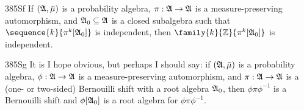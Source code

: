 \spheader 385Sf  If $(\frak A,\bar\mu)$ is a probability algebra,
$\pi:\frak A\to\frak A$ is a measure-preserving automorphism, and
$\frak A_0\subseteq\frak A$ is a closed subalgebra such that
$\sequence{k}{\pi^k[\frak A_0]}$ is independent, then
$\family{k}{\Bbb Z}{\pi^k[\frak A_0]}$ is independent.
     
\spheader 385Sg
It is I hope obvious, but perhaps I should 
say:  if $(\frak A,\bar\mu)$ is a probability algebra, 
$\phi:\frak A\to\frak A$ is a measure-preserving automorphism, and
$\pi:\frak A\to\frak A$ is a (one- or two-sided) Bernouilli shift with a
root algebra $\frak A_0$, then
$\phi\pi\phi^{-1}$ is a Bernouilli shift and $\phi[\frak A_0]$ is a root
algebra for $\phi\pi\phi^{-1}$.

